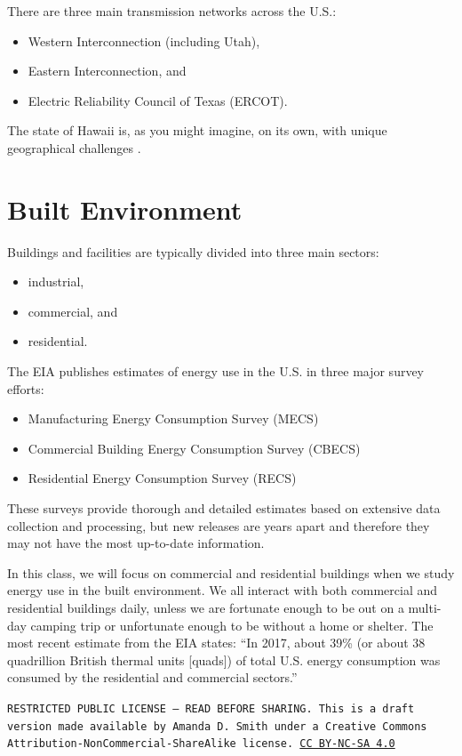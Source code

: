 \documentclass[10pt]{article}
\begin{document}
There are three main transmission networks across the U.S.: \begin{itemize}
\item Western Interconnection (including Utah),
\item Eastern Interconnection, and
\item Electric Reliability Council of Texas (ERCOT).
\end{itemize}

The state of Hawaii is, as you might imagine, on its own, with unique geographical challenges  \cite{noauthor_undated-wl}.

\section{Built Environment}

Buildings and facilities are typically divided into three main sectors: 

\begin{itemize}
    \item industrial, 
    \item commercial, and
    \item residential.
\end{itemize}

The EIA publishes estimates of energy use in the U.S. in three major survey efforts:

\begin{itemize}
    \item Manufacturing Energy Consumption Survey (MECS) \cite{noauthor_undated-dy}
    \item Commercial Building Energy Consumption Survey (CBECS) \cite{CBECS}
    \item Residential Energy Consumption Survey (RECS) \cite{RECS}
\end{itemize}

These surveys provide thorough and detailed estimates based on extensive data collection and processing, but new releases are years apart and therefore they may not have the most up-to-date information.

In this class, we will focus on commercial and residential buildings when we study energy use in the built environment. We all interact with both commercial and residential buildings daily, unless we are fortunate enough to be out on a multi-day camping trip or unfortunate enough to be without a home or shelter.
The most recent estimate from the EIA states: ``In 2017, about 39\% (or about 38 quadrillion British thermal units [quads]) of total U.S. energy consumption was consumed by the residential and commercial sectors.'' \cite{noauthor_undated-ow}



\bigskip

\noindent
\texttt{\footnotesize RESTRICTED PUBLIC LICENSE --- READ BEFORE SHARING. This is a draft version made available by Amanda D. Smith under a Creative Commons Attribution-NonCommercial-ShareAlike license. 
\href{https://creativecommons.org/licenses/by-nc-sa/4.0/}{CC BY-NC-SA 4.0}}

\newpage
\printbibliography
\end{document}
